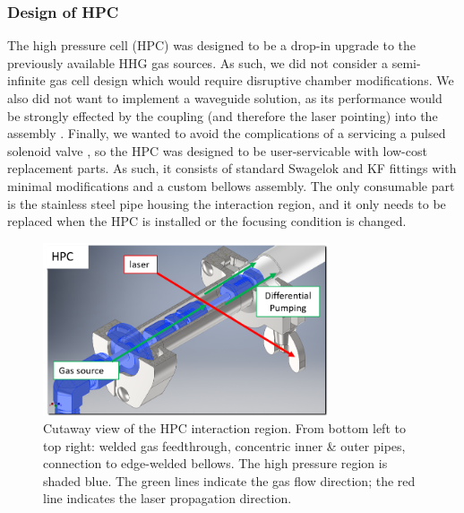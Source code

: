 \subsubsection{Design of HPC}

The high pressure cell (HPC) was designed to be a drop-in upgrade to the previously available HHG gas sources. As such, we did not consider a semi-infinite gas cell design which would require disruptive chamber modifications. We also did not want to implement a waveguide solution, as its performance would be strongly effected by the coupling (and therefore the laser pointing) into the assembly \cite{popmintchevExtendedPhaseMatching2008,popmintchevPhaseMatchingHigh2009}. Finally, we wanted to avoid the complications of a servicing a pulsed solenoid valve \cite{evenEvenLavieValveSource2015}, so the HPC was designed to be user-servicable with low-cost replacement parts. As such, it consists of standard Swagelok and KF fittings with minimal modifications and a custom bellows assembly. The only consumable part is the stainless steel pipe housing the interaction region, and it only needs to be replaced when the HPC is installed or the focusing condition is changed.

\begin{figure}
	\centering
	\includegraphics[width=0.75\textwidth]{figures/chap3/HPC_cutaway2.png}
	\caption{Cutaway view of the HPC interaction region. From bottom left to top right: welded gas feedthrough, concentric inner \& outer pipes, connection to edge-welded bellows. The high pressure region is shaded blue. The green lines indicate the gas flow direction; the red line indicates the laser propagation direction.}
	\label{fig:HPC_cutaway2}
\end{figure}

